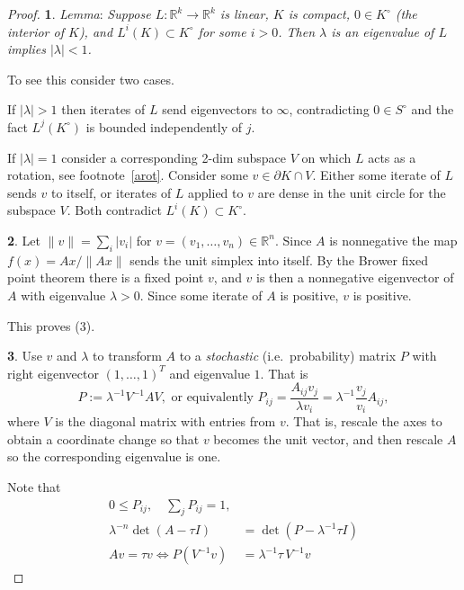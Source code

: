 \documentclass[a4paper]{amsart}
\theoremstyle{plain}
\theoremstyle{definition}
\theoremstyle{remark}
\begin{document}
\begin{proof}\mbox{}

\noindent \textbf{1}.  \emph{Lemma}: \emph{Suppose $ L: \mathbb{R}^k \to \mathbb{R}^k $ is linear, $ K $ is compact, $ 0 \in K^\circ $ (the interior of $ K $), and $ L^i(K)\subset K^\circ$ for some $ i >0 $.  Then $ \lambda $ is an eigenvalue of $ L $ implies $ | \lambda | < 1 $.}

To see this consider two cases.

If $   | \lambda | > 1 $ then iterates of $ L $ send eigenvectors to $ \infty $, contradicting $   0 \in S^\circ $ and the fact $ L^j(K^\circ) $ is bounded independently of $ j $.

If $ |\lambda| = 1$ consider a corresponding 2-dim subspace $ V $ on which $ L $  acts as a rotation, see footnote~\ref{arot}.  Consider some $ v \in \partial K \cap V $. Either some iterate of $ L $ sends $ v $ to itself, or iterates of $ L $ applied to $ v$ are dense in the unit circle for the subspace $ V $.  Both  contradict  $ L^i(K)\subset K^\circ$.

\medskip \noindent \textbf{2}. Let $\|v\|= \sum_i|v_i| $ for $ v = (v_1,\dots, v_n) \in \mathbb{R}^n$.
  Since $ A $ is nonnegative the map $ f(x) = Ax/\|Ax\| $ sends the unit simplex into itself.  By the Brower fixed point theorem there is a fixed point $ v $, and $ v $ is  then a  nonnegative eigenvector of $ A $ with   eigenvalue $ \lambda >0$.  Since some iterate of $ A $ is positive, $v  $ is positive.

This proves (3).


\medskip \noindent \textbf{3}.  Use $ v $ and $ \lambda $ to transform $ A $ to a  \emph{stochastic}  (i.e.\ probability)  matrix $ P $ with right eigenvector $(1,\dots, 1)^T $ and eigenvalue $ 1 $.   That is
\begin{equation} \label{dfPA}
P := \lambda ^{-1} V^{-1} A V, \text{ or equivalently } P_{ij} = \frac{A_{ij}v_j}{\lambda v_i} = \lambda ^{-1}\frac{v_j}{v_i} A_{ij},
\end{equation} 
where $ V $ is the diagonal matrix with entries from $ v $.   That is, rescale the axes to obtain a coordinate change so that   $ v $ becomes  the unit vector, and then rescale $ A $ so the corresponding  eigenvalue is  one.

Note that 
\begin{align*} 
0\leq P_{ij}, \quad \sum_j P_{ij} = 1,\\
\lambda ^{-n}  \det(A-\tau I) &= \det( P-\lambda ^{-1}\tau I) \\
Av = \tau v \Longleftrightarrow  P(V^{-1}v) &= \lambda ^{-1}\tau\, V^{-1}v 
\end{align*} 


\end{proof}
\end{document}
